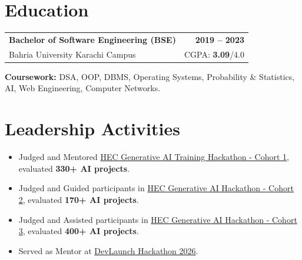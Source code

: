 \documentclass[a4paper,12pt]{article}
\begin{document}
\section{Education}

\begin{tabularx}{\linewidth}{@{}X r@{}}
\textbf{Bachelor of Software Engineering (BSE)} & \textbf{2019 -- 2023} \\
Bahria University Karachi Campus & CGPA: \textbf{3.09}/4.0 \\
\end{tabularx}
\textbf{Coursework:} DSA, OOP, DBMS, Operating Systems, Probability \& Statistics, AI, Web Engineering, Computer Networks.

\section{Leadership Activities}
\begin{itemize}
    \item Judged and Mentored \href{https://www.linkedin.com/posts/aahmedfaraz_generativeai-ai-hec-activity-7425167066854367232-6e_e?utm_source=share&utm_medium=member_desktop&rcm=ACoAADdJH-cBzPnm9JIV3RhrpK_TvX28bFX_rEY}{HEC Generative AI Training Hackathon - Cohort 1}, evaluated \textbf{330+ AI projects}.
    \item Judged and Guided participants in \href{https://www.linkedin.com/posts/aahmedfaraz_%F0%9D%90%89%F0%9D%90%AE%F0%9D%90%9D%F0%9D%90%A0%F0%9D%90%9E-%F0%9D%90%9A%F0%9D%90%A7%F0%9D%90%9D-%F0%9D%90%8C%F0%9D%90%9E%F0%9D%90%A7%F0%9D%90%AD%F0%9D%90%A8%F0%9D%90%AB-%F0%9D%90%87%F0%9D%90%84%F0%9D%90%82-%F0%9D%90%86%F0%9D%90%9E%F0%9D%90%A7%F0%9D%90%9E%F0%9D%90%AB%F0%9D%90%9A%F0%9D%90%AD%F0%9D%90%A2%F0%9D%90%AF%F0%9D%90%9E-activity-7444435079281651712-QJVV?utm_source=share&utm_medium=member_desktop&rcm=ACoAADdJH-cBzPnm9JIV3RhrpK_TvX28bFX_rEY}{HEC Generative AI Hackathon - Cohort 2}, evaluated \textbf{170+ AI projects}.
    \item Judged and Assisted participants in \href{https://www.linkedin.com/posts/aahmedfaraz_3-%F0%9D%90%89%F0%9D%90%AE%F0%9D%90%9D%F0%9D%90%A0%F0%9D%90%9E-%F0%9D%90%86%F0%9D%90%9E%F0%9D%90%A7%F0%9D%90%9E%F0%9D%90%AB%F0%9D%90%9A%F0%9D%90%AD%F0%9D%90%A2%F0%9D%90%AF%F0%9D%90%9E-%F0%9D%90%80-activity-7471591384982970368-KV1o?utm_source=share&utm_medium=member_desktop&rcm=ACoAADdJH-cBzPnm9JIV3RhrpK_TvX28bFX_rEY}{HEC Generative AI Hackathon - Cohort 3}, evaluated \textbf{400+ AI projects}.
    \item Served as Mentor at \href{https://www.linkedin.com/posts/aahmedfaraz_icodeguru-wpbrigade-hackathon-activity-7471595508785020928-F3Z6?utm_source=share&utm_medium=member_desktop&rcm=ACoAADdJH-cBzPnm9JIV3RhrpK_TvX28bFX_rEY}{DevLaunch Hackathon 2026}.
\end{itemize}
\end{document}
